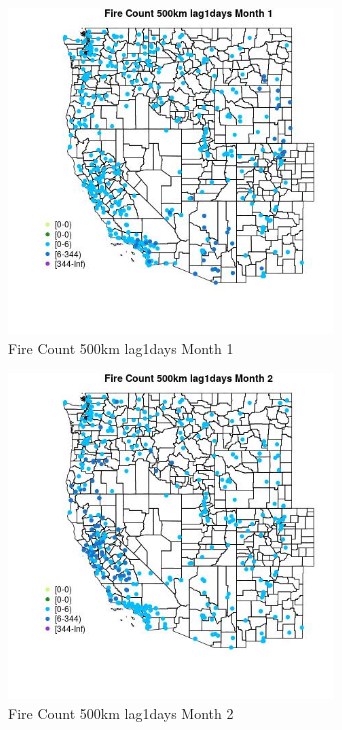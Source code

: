 \begin{figure} 
\centering  
\includegraphics[width=0.77\textwidth]{Code_Outputs/Report_ML_input_PM25_Step4_part_e_de_duplicated_aves_compiled_2019-05-18wNAs_MapObsMo1Fire_Count_500km_lag1days.jpg} 
\caption{\label{fig:Report_ML_input_PM25_Step4_part_e_de_duplicated_aves_compiled_2019-05-18wNAsMapObsMo1Fire_Count_500km_lag1days}Fire Count 500km lag1days Month 1} 
\end{figure} 
 

\begin{figure} 
\centering  
\includegraphics[width=0.77\textwidth]{Code_Outputs/Report_ML_input_PM25_Step4_part_e_de_duplicated_aves_compiled_2019-05-18wNAs_MapObsMo2Fire_Count_500km_lag1days.jpg} 
\caption{\label{fig:Report_ML_input_PM25_Step4_part_e_de_duplicated_aves_compiled_2019-05-18wNAsMapObsMo2Fire_Count_500km_lag1days}Fire Count 500km lag1days Month 2} 
\end{figure} 
 


